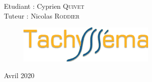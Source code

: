 \begin{titlepage}
  \Large
  Etudiant : Cyprien \textsc{Quivet}\\ %
  \Large
  Tuteur : Nicolas  \textsc{Roddier}\\ %
  
  
  


  \begin{figure}[b]
    \centering
    \includegraphics{img/LogoTachyssema.png}\\[1cm] %
    \label{fig:LogoTachyssema}
  \end{figure}
  {\Large Avril 2020}\\[2cm] %

  
   
  
  \end{titlepage}